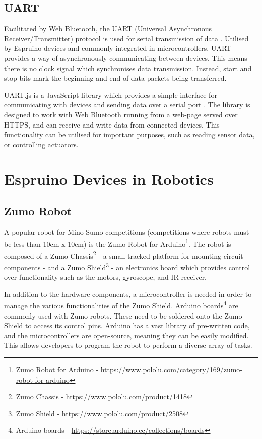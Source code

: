 \documentclass{l4proj}
\begin{document}
\subsection{UART}\label{sec:uart-background}
Facilitated by Web Bluetooth, the UART (Universal Asynchronous Receiver/Transmitter) protocol is used for serial transmission of data \citep{pena2020uart}. Utilised by Espruino devices and commonly integrated in microcontrollers, UART provides a way of asynchronously communicating between devices. This means there is no clock signal which synchronises data transmission. Instead, start and stop bits mark the beginning and end of data packets being transferred.

UART.js is a JavaScript library which provides a simple interface for communicating with devices and sending data over a serial port \citep{uartjs}. The library is designed to work with Web Bluetooth running from a web-page served over HTTPS, and can receive and write data from connected devices. This functionality can be utilised for important purposes, such as reading sensor data, or controlling actuators.

\section{Espruino Devices in Robotics}
\subsection{Zumo Robot}\label{sec:zumo-robot-background}
A popular robot for Mino Sumo competitions (competitions where robots must be less than 10cm x 10cm) is the Zumo Robot for Arduino\footnote{Zumo Robot for Arduino - \url{https://www.pololu.com/category/169/zumo-robot-for-arduino}}. The robot is composed of a Zumo Chassis\footnote{Zumo Chassis - \url{https://www.pololu.com/product/1418}} - a small tracked platform for mounting circuit components - and a Zumo Shield\footnote{Zumo Shield - \url{https://www.pololu.com/product/2508}} - an electronics board which provides control over functionality such as the motors, gyroscope, and IR receiver.

In addition to the hardware components, a microcontroller is needed in order to manage the various functionalities of the Zumo Shield. Arduino boards\footnote{Arduino boards - \url{https://store.arduino.cc/collections/boards}} are commonly used with Zumo robots. These need to be soldered onto the Zumo Shield to access its control pins. Arduino has a vast library of pre-written code, and the microcontrollers are open-source, meaning they can be easily modified. This allows developers to program the robot to perform a diverse array of tasks. 
\end{document}
